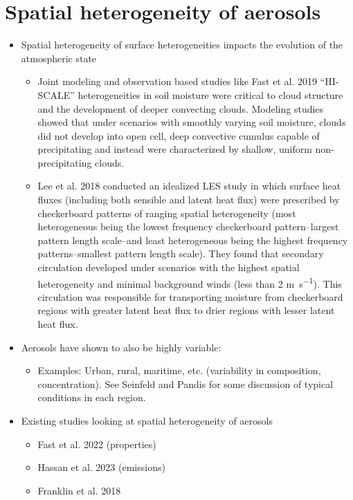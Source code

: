 \cite{seinfeld_atmospheric_1998}

\section{Spatial heterogeneity of aerosols}

\begin{itemize}

\item Spatial heterogeneity of surface heterogeneities impacts the evolution of the atmospheric state
\begin{itemize}
\item Joint modeling and observation based studies like Fast et al. 2019 “HI-SCALE” heterogeneities in soil moisture were critical to cloud structure and the development of deeper convecting clouds. Modeling studies showed that under scenarios with smoothly varying soil moisture, clouds did not develop into open cell, deep convective cumulus capable of precipitating and instead were characterized by shallow, uniform non-precipitating clouds. 
\item Lee et al. 2018 conducted an idealized LES study in which surface heat fluxes (including both sensible and latent heat flux) were prescribed by checkerboard patterns of ranging spatial heterogeneity (most heterogeneous being the lowest frequency checkerboard pattern--largest pattern length scale--and least heterogeneous being the highest frequency patterns--smallest pattern length scale). They found that secondary circulation developed under scenarios with the highest spatial heterogeneity and minimal background winds (less than 2 \si{m.s^{-1}}). This circulation was responsible for transporting moisture from checkerboard regions with greater latent heat flux to drier regions with lesser latent heat flux. 
\end{itemize}

\item Aerosols have shown to also be highly variable:
\begin{itemize}
\item Examples: Urban, rural, maritime, etc. (variability in composition, concentration). See Seinfeld and Pandis for some discussion of typical conditions in each region.
\end{itemize}

\item Existing studies looking at spatial heterogeneity of aerosols
\begin{itemize}
\item Fast et al. 2022 (properties)
\item Hassan et al. 2023 (emissions)
\item Franklin et al. 2018
\end{itemize}


\end{itemize}
